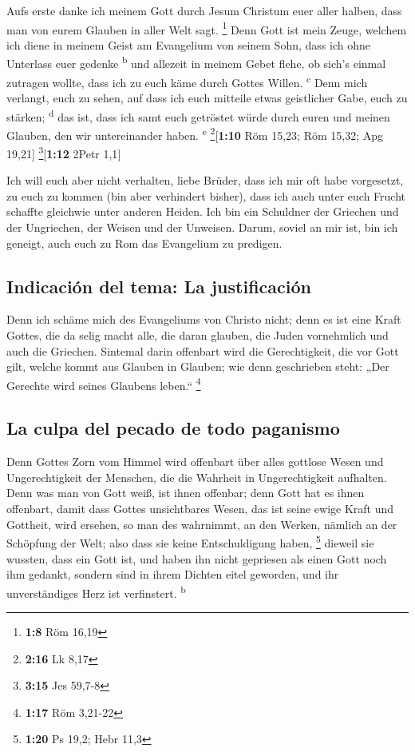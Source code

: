  Aufs erste danke ich meinem Gott durch Jesum Christum
euer aller halben, dass man von eurem Glauben in aller Welt sagt.
\footnote{\textbf{1:8} Röm 16,19}  Denn Gott ist mein
Zeuge, welchem ich diene in meinem Geist am Evangelium von seinem Sohn,
dass ich ohne Unterlass euer gedenke \textsuperscript{b} 
und allezeit in meinem Gebet flehe, ob sich's einmal zutragen wollte,
dass ich zu euch käme durch Gottes Willen. \textsuperscript{c}
 Denn mich verlangt, euch zu sehen, auf dass ich euch
mitteile etwas geistlicher Gabe, euch zu stärken; \textsuperscript{d}
 das ist, dass ich samt euch getröstet würde durch euren
und meinen Glauben, den wir untereinander haben. \textsuperscript{e}
\footnote{\textbf{2:16} Lk 8,17}{[}\textbf{1:10} Röm 15,23; Röm 15,32;
Apg 19,21{]} \footnote{\textbf{3:15} Jes 59,7-8}{[}\textbf{1:12} 2Petr
1,1{]}

 Ich will euch aber nicht verhalten, liebe Brüder, dass
ich mir oft habe vorgesetzt, zu euch zu kommen (bin aber verhindert
bisher), dass ich auch unter euch Frucht schaffte gleichwie unter
anderen Heiden.  Ich bin ein Schuldner der Griechen und
der Ungriechen, der Weisen und der Unweisen.  Darum,
soviel an mir ist, bin ich geneigt, auch euch zu Rom das Evangelium zu
predigen.

\hypertarget{indicaciuxf3n-del-tema-la-justificaciuxf3n}{%
\subsection{Indicación del tema: La
justificación}\label{indicaciuxf3n-del-tema-la-justificaciuxf3n}}

 Denn ich schäme mich des Evangeliums von Christo nicht;
denn es ist eine Kraft Gottes, die da selig macht alle, die daran
glauben, die Juden vornehmlich und auch die Griechen. 
Sintemal darin offenbart wird die Gerechtigkeit, die vor Gott gilt,
welche kommt aus Glauben in Glauben; wie denn geschrieben steht: „Der
Gerechte wird seines Glaubens leben.`` \footnote{\textbf{1:17} Röm
  3,21-22}

\hypertarget{la-culpa-del-pecado-de-todo-paganismo}{%
\subsection{La culpa del pecado de todo
paganismo}\label{la-culpa-del-pecado-de-todo-paganismo}}

 Denn Gottes Zorn vom Himmel wird offenbart über alles
gottlose Wesen und Ungerechtigkeit der Menschen, die die Wahrheit in
Ungerechtigkeit aufhalten.  Denn was man von Gott weiß,
ist ihnen offenbar; denn Gott hat es ihnen offenbart, 
damit dass Gottes unsichtbares Wesen, das ist seine ewige Kraft und
Gottheit, wird ersehen, so man des wahrnimmt, an den Werken, nämlich an
der Schöpfung der Welt; also dass sie keine Entschuldigung haben,
\footnote{\textbf{1:20} Ps 19,2; Hebr 11,3}  dieweil sie
wussten, dass ein Gott ist, und haben ihn nicht gepriesen als einen Gott
noch ihm gedankt, sondern sind in ihrem Dichten eitel geworden, und ihr
unverständiges Herz ist verfinstert. \textsuperscript{b}

